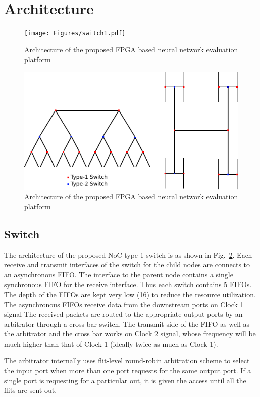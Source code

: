 \section{Architecture}
\label{sec:arch}

\begin{figure}[t]
\centering
   \texttt{[image: Figures/switch1.pdf]}
   \caption{Architecture of the proposed FPGA based neural network evaluation platform}
   \label{fig:switchArch}
\end{figure}


\begin{figure}[t]
\centering
   \includegraphics[height=0.5\columnwidth]{Figures/HNoC.pdf}
   \caption{Architecture of the proposed FPGA based neural network evaluation platform}
   \label{fig:switchArch}
\end{figure}

\subsection{Switch}
The architecture of the proposed NoC type-1 switch is as shown in Fig.~\ref{fig:switchArch}.
Each receive and transmit interfaces of the switch for the child nodes are connects to an asynchronous FIFO.
The interface to the parent node contains a single synchronous FIFO for the receive interface.
Thus each switch contains 5 FIFOs.
The depth of the FIFOs are kept very low (16) to reduce the resource utilization.
The asynchronous FIFOs receive data from the downstream ports on Clock 1 signal
The received packets are routed to the appropriate output ports by an arbitrator through a cross-bar switch.
The transmit side of the FIFO as well as the arbitrator and the cross bar works on Clock 2 signal, whose frequency will be much higher than that of Clock 1 (ideally twice as much as Clock 1).

The arbitrator internally uses flit-level round-robin arbitration scheme to select the input port when more than one port requests for the same output port.
If a single port is requesting for a particular out, it is given the access until all the flits are sent out.
